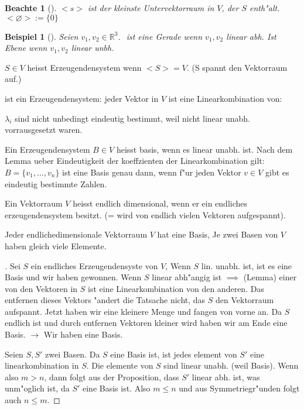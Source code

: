 \documentclass[11pt]{article}
\newtheorem{exa}{Beispiel}[section]
\newtheorem*{notte}{Beachte}
\begin{document}
\begin{notte}[] \label{}
\(<s>\) ist der kleinste Untervektorraum in \(V\), der \(S\) enth"alt. 
\(<\varnothing >:=\{0\}\)
\end{notte}

\begin{exa}[] \label{}
Seien \(v_1, v_2 \in \mathbb{R}^3\).
\(<v1,v2>\) ist eine Gerade wenn \(v_1,v_2\) linear abh. Ist Ebene wenn \(v_1,v_2\)
linear unbh.
\end{exa}

\begin{definition}{}{}
\(S\in V\) heisst Erzeugendensystem wenn \(<S>=V\). (S spannt den Vektorraum auf.)

ist ein Erzeugendensystem: jeder Vektor in \(V\) ist eine Linearkombination von:

\(\lambda_i\) sind nicht unbedingt eindeutig bestimmt, weil nicht linear unabh.
vorrausgesetzt waren.
\end{definition}

\begin{definition}{}{}
Ein Erzeugendensystem \(B\in V\) heisst basis, wenn es linear unabh. ist. Nach dem
Lemma ueber Eindeutigkeit der koeffzienten der Linearkombination gilt: \(B=\{v_1,
..., v_n\}\) ist eine Basis genau dann, wenn f"ur jeden Vektor \(v \in V\) gibt es
 eindeutig bestimmte Zahlen.
\end{definition}

\begin{definition}{}{}
Ein Vektorraum \(V\) heisst endlich dimensional, wenn er ein endliches
erzeugendensystem besitzt. (= wird von endlich vielen Vektoren aufgespannt).
\end{definition}

\begin{theo}{}{}
Jeder endlichedimensionale Vektorraum \(V\)  hat eine Basis, Je zwei Basen von \(V\)
haben gleich viele Elemente.
\end{theo}

\begin{proof}[] \label{}
Sei \(S\) ein endliches Erzeugendensyste von \(V\), Wenn \(S\) lin. unabh. ist, ist es
eine Basis und wir haben gewonnen. Wenn \(S\) linear abh"angig ist $\implies$
(Lemma) einer von den Vektoren in \(S\) ist eine Linearkombination von den
anderen. Das entfernen dieses Vektors "andert die Tatsache nicht, das \(S\) den
Vektorraum aufspannt. Jetzt haben wir eine kleinere Menge und fangen von vorne
an. Da \(S\) endlich ist und durch entfernen Vektoren kleiner wird haben wir am
Ende eine Basis.
\(\rightarrow\) Wir haben eine Basis.

Seien \(S, S'\) zwei Basen. Da \(S\) eine Basis ist, ist jedes element von \(S'\) eine
linearkombination in \(S\). Die elemente von \(S\) sind linear unabh. (weil Basis).
Wenn also \(m>n\), dann folgt aus der Proposition, dass \(S'\) linear abh. ist, was
unm"oglich ist, da \(S'\) eine Basis ist. Also \(m \leq n\) und aus Symmetriegr"unden folgt auch \(n \leq m\).
\end{proof}
\end{document}

